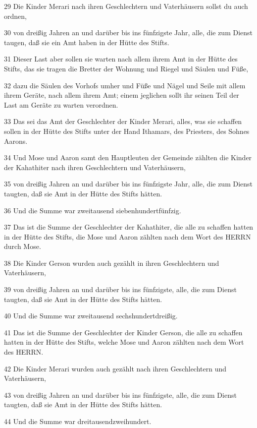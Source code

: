 \par 29 Die Kinder Merari nach ihren Geschlechtern und Vaterhäusern sollst du auch ordnen,
\par 30 von dreißig Jahren an und darüber bis ins fünfzigste Jahr, alle, die zum Dienst taugen, daß sie ein Amt haben in der Hütte des Stifts.
\par 31 Dieser Last aber sollen sie warten nach allem ihrem Amt in der Hütte des Stifts, das sie tragen die Bretter der Wohnung und Riegel und Säulen und Füße,
\par 32 dazu die Säulen des Vorhofs umher und Füße und Nägel und Seile mit allem ihrem Geräte, nach allem ihrem Amt; einem jeglichen sollt ihr seinen Teil der Last am Geräte zu warten verordnen.
\par 33 Das sei das Amt der Geschlechter der Kinder Merari, alles, was sie schaffen sollen in der Hütte des Stifts unter der Hand Ithamars, des Priesters, des Sohnes Aarons.
\par 34 Und Mose und Aaron samt den Hauptleuten der Gemeinde zählten die Kinder der Kahathiter nach ihren Geschlechtern und Vaterhäusern,
\par 35 von dreißig Jahren an und darüber bis ins fünfzigste Jahr, alle, die zum Dienst taugten, daß sie Amt in der Hütte des Stifts hätten.
\par 36 Und die Summe war zweitausend siebenhundertfünfzig.
\par 37 Das ist die Summe der Geschlechter der Kahathiter, die alle zu schaffen hatten in der Hütte des Stifts, die Mose und Aaron zählten nach dem Wort des HERRN durch Mose.
\par 38 Die Kinder Gerson wurden auch gezählt in ihren Geschlechtern und Vaterhäusern,
\par 39 von dreißig Jahren an und darüber bis ins fünfzigste, alle, die zum Dienst taugten, daß sie Amt in der Hütte des Stifts hätten.
\par 40 Und die Summe war zweitausend sechshundertdreißig.
\par 41 Das ist die Summe der Geschlechter der Kinder Gerson, die alle zu schaffen hatten in der Hütte des Stifts, welche Mose und Aaron zählten nach dem Wort des HERRN.
\par 42 Die Kinder Merari wurden auch gezählt nach ihren Geschlechtern und Vaterhäusern,
\par 43 von dreißig Jahren an und darüber bis ins fünfzigste, alle, die zum Dienst taugten, daß sie Amt in der Hütte des Stifts hätten.
\par 44 Und die Summe war dreitausendzweihundert.
